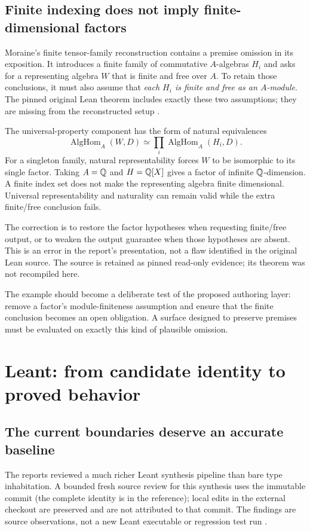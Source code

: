 \documentclass[11pt,letterpaper]{article}
\newcommand{\code}[1]{\texttt{\detokenize{#1}}}
\theoremstyle{definition}\newtheorem{definition}[proposition]{Definition}
\theoremstyle{remark}\newtheorem{remark}[proposition]{Remark}
\begin{document}
\subsection{Finite indexing does not imply finite-dimensional factors}\label{sec:tensor}
Moraine's finite tensor-family reconstruction contains a premise omission in
its exposition. It introduces a finite family of commutative $A$-algebras $H_i$
and asks for a representing algebra $W$ that is finite and free over $A$.
To retain those conclusions, it must also assume that \emph{each $H_i$ is
finite and free as an $A$-module}. The pinned original Lean theorem includes
exactly these two assumptions; they are missing from the reconstructed setup
\cite[Section 6.2]{moraine}\cite{tensor-source}.

The universal-property component has the form of natural equivalences
\[
 \operatorname{AlgHom}_A(W,D)
 \simeq\prod_i\operatorname{AlgHom}_A(H_i,D).
\]
For a singleton family, natural representability forces $W$ to be isomorphic
to its single factor. Taking $A=\mathbb Q$ and $H=\mathbb Q[X]$ gives a factor of infinite
$\mathbb Q$-dimension. A finite index set does not make the representing algebra
finite dimensional. Universal representability and naturality can remain
valid while the extra finite/free conclusion fails.

The correction is to restore the factor hypotheses when requesting finite/free
output, or to weaken the output guarantee when those hypotheses are absent.
This is an error in the report's presentation, not a flaw identified in the
original Lean source. The source is retained as pinned read-only evidence;
its theorem was not recompiled here.

The example should become a deliberate test of the proposed authoring layer:
remove a factor's module-finiteness assumption and ensure that the finite
conclusion becomes an open obligation. A surface designed to preserve premises
must be evaluated on exactly this kind of plausible omission.

\section{Leant: from candidate identity to proved behavior}\label{sec:leant}

\subsection{The current boundaries deserve an accurate baseline}
The reports reviewed a much richer Leant synthesis pipeline than bare
type inhabitation. A bounded fresh source review for this synthesis uses the
immutable commit \code{823259f} (the complete identity is in the reference); local edits
in the external checkout are preserved and are not attributed to that commit.
The findings are source observations, not a new Leant executable or regression
test run \cite{leant-source}.
\end{document}
